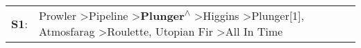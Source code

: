 \begin{supertabular}{p{0.03\textwidth}p{0.92\textwidth}}
 \textbf{S1}:  &  Prowler\textsuperscript{} \textgreater \enspace Pipeline\textsuperscript{} \textgreater \enspace \textbf{Plunger\textsuperscript{$\wedge$}} \textgreater \enspace Higgins\textsuperscript{} \textgreater \enspace Plunger[1]\textsuperscript{}, \enspace Atmosfarag\textsuperscript{} \textgreater \enspace Roulette\textsuperscript{}, \enspace Utopian Fir\textsuperscript{} \textgreater \enspace All In Time\textsuperscript{}  \enspace  \\
\end{supertabular}
